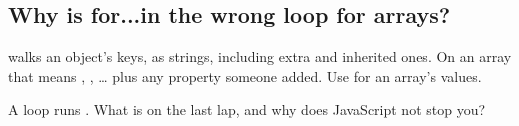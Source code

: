 \subsection{Why is for...in the wrong loop for arrays?}%
 walks an object's keys, as strings, including extra and inherited ones. On an array that means , , \ldots{} plus any property someone added. Use  for an array's values.

\begin{ponder}A loop runs . What is  on the last lap, and why does JavaScript not stop you?\end{ponder}
